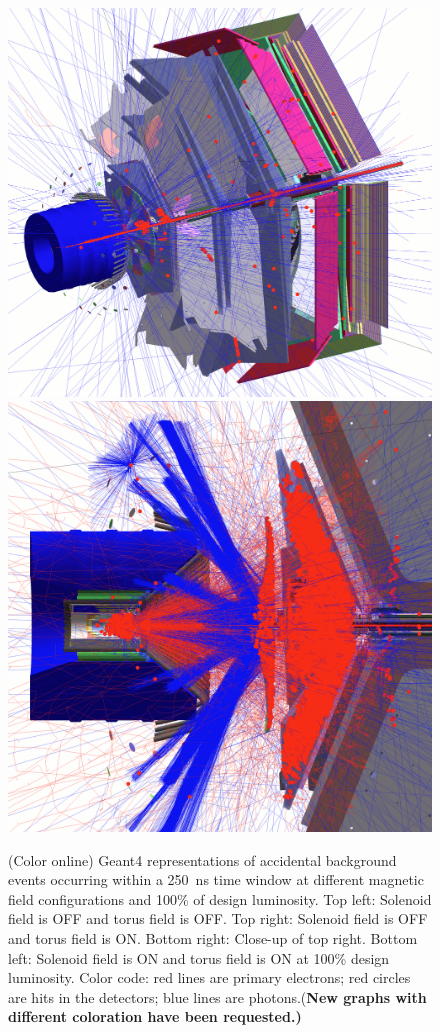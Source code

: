 \documentclass[final,3p,twocolumn]{elsarticle}
\begin{document}
\begin{figure}[htbp!]
{}
\vspace{0.3cm}
\centerline{
	\includegraphics[width=1.0\columnwidth, height=1.0\columnwidth]{FullSolenoidFullTorus.png}
	\includegraphics[width=1.0\columnwidth, height=1.0\columnwidth]{NoSolenoidFullTorusCut2.png}
}
\caption{(Color online) Geant4 representations of accidental background events occurring within a 250~ns time window at
  different magnetic field configurations and 100\% of design luminosity. Top left: Solenoid field is OFF and
  torus field is OFF. Top right: Solenoid field is OFF and torus field is ON. Bottom right: Close-up of top right.
  Bottom left: Solenoid field is ON and torus field is ON at 100\% design luminosity. Color code: red lines are
  primary electrons; red circles are hits in the detectors; blue lines are photons.({\bf New graphs with different 
  coloration have been requested.)}}
  

\end{figure}
\end{document}
